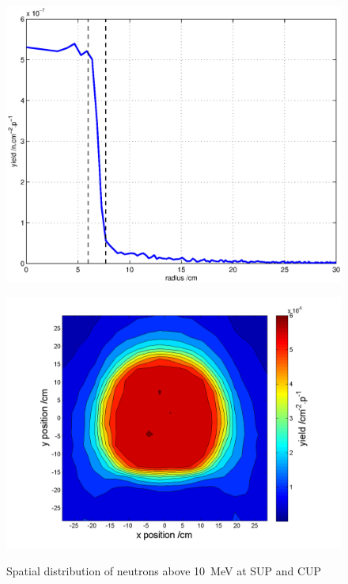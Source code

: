 \documentclass[peerreviewca,11pt,a4paper]{IEEEtran}
\let\MYoriglatexcaption\caption
\renewcommand{\caption}[2][\relax]{\MYoriglatexcaption[#2]{#2}}
\begin{document}
\begin{figure}[t]
    \begin{minipage}{\columnwidth}
        \includegraphics[width=0.9\columnwidth]{SUP10ColRadiusEffect10MeV.eps}
        \label{fig:SUPDensity}
    \end{minipage}
    \begin{minipage}{\columnwidth}
        \includegraphics[width=0.9\columnwidth]{CUP10ColSpatialDistribution10MeV.png}
        \label{fig:CUPDensity}
    \end{minipage}
    \caption{
        Spatial distribution of neutrons above \SI{10}{\MeV} at SUP and CUP
    }
\end{figure}
\end{document}
